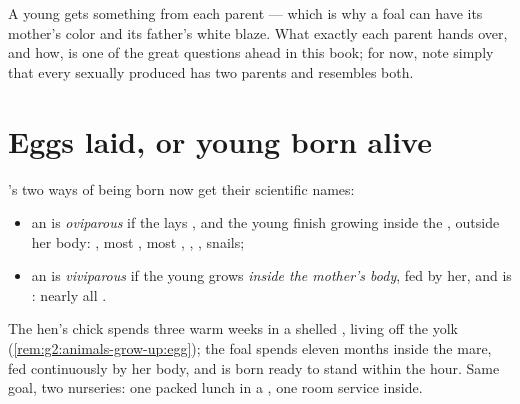 \begin{remark}\label{rem:g4:animal-reproduction:mix}
A young  gets something from each parent --- which is why
a foal can have its mother's color and its father's white
blaze. What exactly each parent hands over, and how, is one of
the great questions ahead in this book; for now, note simply
that every sexually produced  has two parents and
resembles both.
\end{remark}

\section{Eggs laid, or young born alive}

\begin{definition}\label{def:g4:animal-reproduction:ovivivi}
's two ways of being born now
get their scientific names:
\begin{itemize}
  \item an  is \emph{oviparous} if the
         lays \emph{}, and the young finish growing
        inside the , outside her body: , most ,
        most , , , snails;
  \item an  is \emph{viviparous} if the
        young grows \emph{inside the mother's body}, fed by
        her, and is \emph{}: nearly all .
\end{itemize}
\end{definition}

\begin{example}\label{ex:g4:animal-reproduction:nurseries}
The hen's chick spends three warm weeks in a shelled ,
living off the yolk (\cref{rem:g2:animals-grow-up:egg}); the
foal spends eleven months inside the mare, fed continuously by
her body, and is born ready to stand within the hour. Same
goal, two nurseries: one packed lunch in a , one room
service inside.
\end{example}

